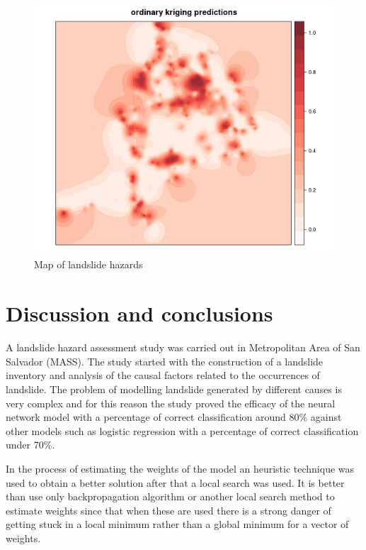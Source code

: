 \documentclass[11pt,twoside]{rmta2010esp}%
\begin{document}
 \begin{center}
  \begin{figure}[H]
   \centering
   \includegraphics[scale=0.40]{img02}
   \caption{\small{Map of landslide hazards}}
   \label{fig:img02}
  \end{figure}
 \end{center}


\section{Discussion and conclusions}
A landslide hazard assessment study was carried out in Metropolitan Area of San Salvador (MASS). The study started with the construction of a landslide inventory and analysis of the causal factors related to the occurrences of landslide. The problem of modelling landslide generated by different causes is very complex and for this reason the study proved the efficacy of the neural network model with a percentage of correct classification around 80\% against other models such as logistic regression with a percentage of correct classification under 70\%. 

In the process of estimating the weights of the model an heuristic technique was used to obtain a better solution after that a local search was used. It is better than use only backpropagation algorithm or another local search method to estimate weights since that when these are used there is a strong danger of getting stuck in a local minimum rather than a global minimum for a vector of weights.
\end{document}
